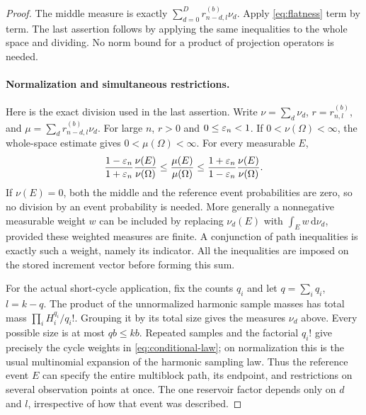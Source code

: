 \documentclass[11pt]{article}
\theoremstyle{definition}\newtheorem{definition}[theorem]{Definition}
\theoremstyle{remark}\newtheorem{remark}[theorem]{Remark}
\newcommand{\dd}{\,\mathrm d}\newcommand{\ind}{\mathbf1}
\numberwithin{equation}{section}\allowdisplaybreaks
\begin{document}
\begin{proof}
The middle measure is exactly
$\sum_{d=0}^D r_{n-d,l}^{(b)}\nu_d$.
Apply \eqref{eq:flatness} term by term. The last assertion follows by
applying the same inequalities to the whole space and dividing.
No norm bound for a product of projection operators is needed.

\paragraph{Normalization and simultaneous restrictions.}
Here is the exact division used in the last assertion. Write
$\nu=\sum_d\nu_d$, $r=r_{n,l}^{(b)}$, and
$\mu=\sum_d r_{n-d,l}^{(b)}\nu_d$. For large $n$, $r>0$ and
$0\le\varepsilon_n<1$. If $0<\nu(\Omega)<\infty$, the whole-space estimate
gives $0<\mu(\Omega)<\infty$. For every measurable $E$,
\[
 \frac{1-\varepsilon_n}{1+\varepsilon_n}\frac{\nu(E)}{\nu(\Omega)}
 \le\frac{\mu(E)}{\mu(\Omega)}
 \le\frac{1+\varepsilon_n}{1-\varepsilon_n}\frac{\nu(E)}{\nu(\Omega)}.
\]
If $\nu(E)=0$, both the middle and the reference event probabilities
are zero, so no division by an event probability is needed. More
generally a nonnegative measurable weight $w$ can be included by
replacing $\nu_d(E)$ with $\int_E w\dd\nu_d$, provided these weighted
measures are finite. A conjunction of path inequalities is exactly
such a weight, namely its indicator. All the inequalities are
imposed on the stored increment vector before forming this sum.

For the actual short-cycle application, fix the counts $q_i$ and let
$q=\sum_iq_i$, $l=k-q$. The product of the unnormalized harmonic
sample masses has total mass $\prod_i H_i^{q_i}/q_i!$. Grouping it
by its total size gives the measures $\nu_d$ above. Every possible
size is at most $qb\le kb$. Repeated samples and the factorial
$q_i!$ give precisely the cycle weights in
\eqref{eq:conditional-law}; on normalization this is the usual
multinomial expansion of the harmonic sampling law. Thus the
reference event $E$ can specify the entire multiblock path, its
endpoint, and restrictions on several observation points at once.
The one reservoir factor depends only on $d$ and $l$, irrespective
of how that event was described.

\end{proof}
\end{document}
